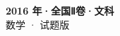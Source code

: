 \documentclass[zihao=-4, a4paper]{ctexart}
\begin{document}
\begin{center}
  {\Large\bfseries 2016 年·全国Ⅱ卷·文科}\\[4pt]
  {\large 数学 · 试题版}
\end{center}
\medskip
{}

\end{document}
